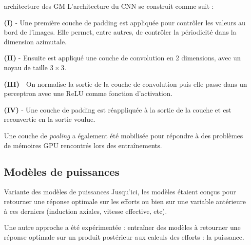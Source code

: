 \documentclass[
11pt,notheorems,hyperref={pdfauthor=whatever}
]{beamer}
\begin{document}
\begin{frame}{architecture des GM}
    L'architecture du CNN se construit comme suit : 
    
    \vspace{0.2cm}

    \textbf{(I)} - Une première couche de padding est appliquée pour contrôler les valeurs au bord de l'images. Elle permet, entre autres, de contrôler la périodicité dans la dimension azimutale.

    \vspace{0.2cm}

    \textbf{(II)} - Ensuite est appliqué une couche de convolution en 2 dimensions, avec un noyau de taille $3 \times 3$.

    \vspace{0.2cm}

    \textbf{(III)} - On normalise la sortie de la couche de convolution puis elle passe dans un perceptron avec une ReLU comme fonction d'activation.

    \vspace{0.2cm}

    \textbf{(IV)} - Une couche de padding est réappliquée à la sortie de la couche et est reconvertie en la sortie voulue.

    \vspace{0.3cm}

    Une couche de \textit{pooling} a également été mobilisée pour répondre à des problèmes de mémoires GPU rencontrés lors des entraînements.
\end{frame}



\subsection{Modèles de puissances}

\begin{frame}{Variante des modèles de puissances}
    Jusqu'ici, les modèles étaient conçus pour retourner une réponse optimale sur les efforts ou bien
    sur une variable antérieure à ces derniers (induction axiales, vitesse effective, etc).
    
    \vspace{0.3cm}

    Une autre approche a été expérimentée : entraîner des modèles à retourner une réponse optimale sur un produit postérieur aux calculs des efforts : la puissance. 
\end{frame}
\end{document}
